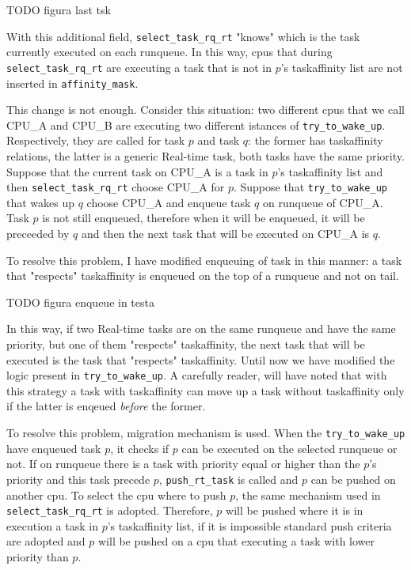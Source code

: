 TODO figura last tsk

With this additional field, \texttt{select\_task\_rq\_rt} "knows" which is the task currently executed on each runqueue. In this way, cpus that during 
\texttt{select\_task\_rq\_rt} are executing a task that is not in $p$'s taskaffinity list are not inserted in \texttt{affinity\_mask}.

This change is not enough. Consider this situation: two different cpus that we call CPU\_A and CPU\_B are executing two different istances of 
\texttt{try\_to\_wake\_up}. Respectively, they are called for task $p$ and task $q$: the former has taskaffinity relations, the latter is a generic 
Real-time task, both tasks have the same priority. Suppose that the current task on CPU\_A is a task in $p$'s taskaffinity list and then 
\texttt{select\_task\_rq\_rt} choose CPU\_A for $p$. Suppose that \texttt{try\_to\_wake\_up} that wakes up $q$ choose CPU\_A and enqueue task $q$ on 
runqueue of CPU\_A. Task $p$ is not still enqueued, therefore when it will be enqueued, it will be preceeded by $q$ and then the next task that will
be executed on CPU\_A is $q$.

To resolve this problem, I have modified enqueuing of task in this manner: a task that "respects" taskaffinity is enqueued on the top of a runqueue and not 
on tail. 

TODO figura enqueue in testa

In this way, if two Real-time tasks are on the same runqueue and have the same priority, but one of them "respects" taskaffinity, the next task that 
will be executed is the task that "respects" taskaffinity. Until now we have modified the logic present in \texttt{try\_to\_wake\_up}.
A carefully reader, will have noted that with this strategy a task with taskaffinity can move up a task without taskaffinity only if the latter is enqeued 
\textit{before} the former.

To resolve this problem, migration mechanism is used. When the \texttt{try\_to\_wake\_up} have enqueued task $p$, it checks if $p$  can be executed on the 
selected runqueue or not. If on runqueue there is a task with priority equal or higher than the $p$'s priority and this task precede $p$, 
\texttt{push\_rt\_task} is called and $p$ can be pushed on another cpu. To select the cpu where to push $p$, the same mechanism used in 
\texttt{select\_task\_rq\_rt} is adopted. Therefore, $p$ will be pushed where it is in execution a task in $p$'s taskaffinity list, if it is impossible
standard push criteria are adopted and $p$ will be pushed on a cpu that executing a task with lower priority than $p$.


